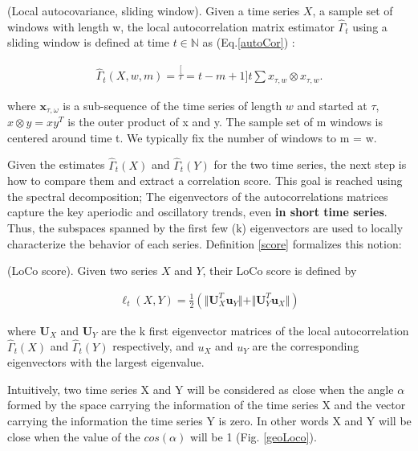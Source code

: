 \begin{definition}
(Local autocovariance, sliding window). Given a time series $X$, a sample set of windows with length w, the local autocorrelation matrix estimator $\hat{\Gamma}_{t}$ using a sliding window is defined at time $t \in \mathbb{N} $ as (Eq.\ref{autoCor}) : 

\begin{eqnarray}
\hat{\varGamma}_{t}(X,w,m)=\stackrel[\tau=t-m+1]{t}{\sum}x_{\tau,w}\otimes x_{\tau,w}.
\label{autoCor}
\end{eqnarray}

where $\boldsymbol{x}_{\tau,\omega}$ is a sub-sequence of the time series of length $w$ and started at $\tau$, $x \otimes y = xy^T$ is the outer product of x and y. The sample set of m windows is centered around time t.
We typically fix the number of windows to m = w.
\end{definition}

Given the estimates $\hat{\Gamma}_{t}(X)$ and $\hat{\Gamma}_{t}(Y)$ for the two time series, the next step is how to compare them and extract a correlation score. This goal is reached using the spectral decomposition; The eigenvectors of the autocorrelations matrices capture the key aperiodic and oscillatory trends, even \textbf{in short time series}.  Thus, the subspaces spanned by the first few (k) eigenvectors are used  to locally characterize the behavior of each series. Definition \ref{score} formalizes this notion: 


\begin{definition}
\label{score}
(LoCo score). Given two series $X$ and $Y$, their LoCo score is defined by

\begin{eqnarray}
\ell_{t}(X,Y)=\frac{1}{2}(\Vert
\boldsymbol{U}_{X}^{T}\boldsymbol{u}_{Y}\Vert+\Vert
\boldsymbol{U}_{Y}^{T}\boldsymbol{u}_{X}\Vert)
\end{eqnarray}

\end{definition}    


where $\boldsymbol{U}_X$ and  $\boldsymbol{U}_Y$ are the k first eigenvector
matrices of the local autocorrelation $\hat{\Gamma}_{t}(X)$ and
$\hat{\Gamma}_{t}(Y)$ respectively, and $u_X$  and $u_Y$  are the
corresponding eigenvectors with the largest eigenvalue. 


Intuitively, two time series X and Y will be considered as close when the angle
$\alpha$ formed by the space carrying the information of the time series X and
the vector carrying the information the time series Y is zero. In other words X
and Y will be close when the value of the $cos(\alpha)$ will be 1 (Fig. \ref{geoLoco}). 

